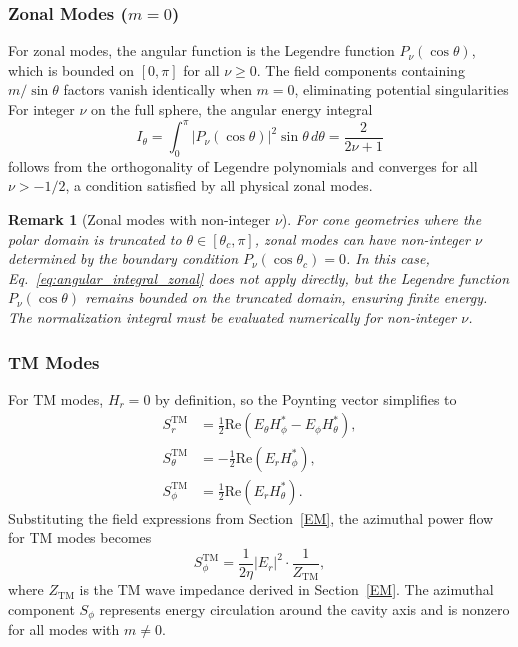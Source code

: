 \documentclass[
  aip,
  amsmath,amssymb,
  preprint
]{revtex4-1}
\newtheorem{remark}{Remark}[section]
\begin{document}
\subsubsection{Zonal Modes ($m = 0$)}
For zonal modes, the angular function is the Legendre function $P_\nu(\cos\theta)$, which is bounded on $[0, \pi]$ for all $\nu \geq 0$. The field components containing $m/\sin\theta$ factors vanish identically when $m = 0$, eliminating potential singularities For integer $\nu$ on the full sphere, the angular energy integral
\begin{equation}
I_\theta = \int_0^\pi |P_\nu(\cos\theta)|^2 \sin\theta \, d\theta = \frac{2}{2\nu + 1}
\label{eq:angular_integral_zonal}
\end{equation}
follows from the orthogonality of Legendre polynomials and converges for all $\nu > -1/2$, a condition satisfied by all physical zonal modes.

\begin{remark}[Zonal modes with non-integer $\nu$]
For cone geometries where the polar domain is truncated to $\theta \in [\theta_c, \pi]$, zonal modes can have non-integer $\nu$ determined by the boundary condition $P_\nu(\cos\theta_c) = 0$. In this case, Eq.~\eqref{eq:angular_integral_zonal} does not apply directly, but the Legendre function $P_\nu(\cos\theta)$ remains bounded on the truncated domain, ensuring finite energy. The normalization integral must be evaluated numerically for non-integer $\nu$.
\end{remark}

\subsubsection{TM Modes}

For TM modes, $H_r = 0$ by definition, so the Poynting vector simplifies to
\begin{align}
S_r^{\mathrm{TM}} &= \frac{1}{2} \mathrm{Re}\left( E_\theta H_\phi^* - E_\phi H_\theta^* \right), \\
S_\theta^{\mathrm{TM}} &= -\frac{1}{2} \mathrm{Re}\left( E_r H_\phi^* \right), \\
S_\phi^{\mathrm{TM}} &= \frac{1}{2} \mathrm{Re}\left( E_r H_\theta^* \right).
\label{eq:poynting_TM}
\end{align}
Substituting the field expressions from Section~\ref{EM}, the azimuthal power flow for TM modes becomes
\begin{equation}
S_\phi^{\mathrm{TM}} = \frac{1}{2\eta} |E_r|^2 \cdot \frac{1}{Z_{\mathrm{TM}}},
\label{eq:S_phi_TM_explicit}
\end{equation}
where $Z_{\mathrm{TM}}$ is the TM wave impedance derived in Section~\ref{EM}. The azimuthal component $S_\phi$ represents energy circulation around the cavity axis and is nonzero for all modes with $m \neq 0$.
\end{document}
